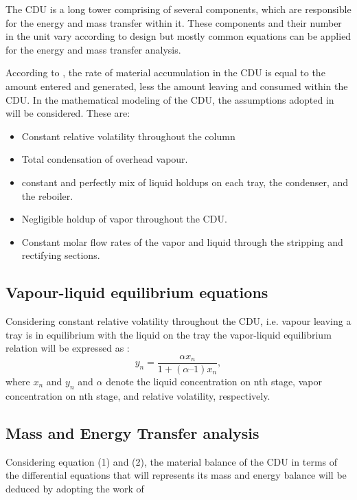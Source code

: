 \documentclass[11pt,a4paper,oneside]{article}
\begin{document}
The CDU is a long tower comprising of several components, which are responsible for the energy and mass transfer within it. These components and their number in the unit vary according to design but mostly common equations can be applied for the energy and mass transfer analysis.

According to \cite{Duraid:31, Duraid:32,Minh:38}, the rate of material accumulation in the CDU is equal to the amount entered and generated, less the amount leaving and consumed within the CDU. In the mathematical modeling of the CDU, the assumptions adopted in \cite{Minh:38,Zhiyun:41,Yousif:42,Wen:39} will be considered. These are:
\begin{itemize}
\item Constant relative volatility throughout the column
\item Total condensation of overhead vapour.
\item constant and
perfectly mix of liquid holdups on each tray, the condenser, and the reboiler.
\item Negligible holdup of vapor throughout the CDU.
\item Constant molar flow rates of the vapor and liquid through the stripping and rectifying sections.

\end{itemize}

\subsection{Vapour-liquid equilibrium equations}
Considering constant relative volatility throughout the CDU, i.e.  vapour leaving a tray is in equilibrium with the liquid on the tray the vapor-liquid equilibrium relation will be expressed as \cite{Anish:37,Suresh:36, Minh:38,Wen:39,Zhiyun:41,Yousif:42,Estiyanti:43,Yun:44}: 
\begin{equation}
  \label{eq:V-L equilibruim}
y_n = \frac{\alpha x_n}{1+(\alpha – 1)x_n} ,
\end{equation}
where $x_n$ and $y_n$ and $\alpha $ denote the liquid concentration on nth stage, vapor concentration on nth stage, and relative volatility, respectively.

\subsection{Mass and Energy Transfer analysis}
Considering equation (1) and (2), the material balance of the CDU in terms of the differential equations that will represents its mass and energy balance will be deduced by adopting the work of \cite{Duraid:32,Suresh:36, Minh:38}
\end{document}
